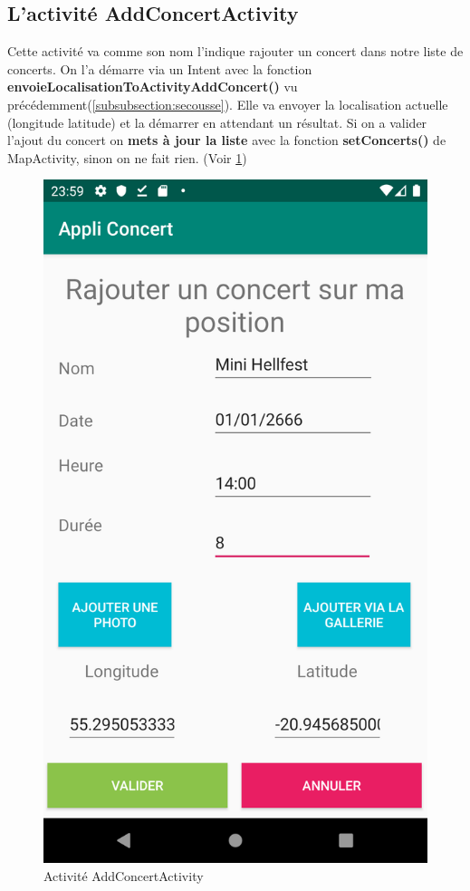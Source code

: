 \documentclass{article}
\begin{document}
\subsection{L'activité AddConcertActivity}
\label{AddConcertActivity}
Cette activité va comme son nom l'indique rajouter un concert dans notre liste de concerts. On l'a démarre via un Intent avec la fonction \textbf{envoieLocalisationToActivityAddConcert()} vu précédemment(\ref{subsubsection:secousse}). Elle va envoyer la localisation actuelle (longitude latitude) et la démarrer en attendant un résultat. Si on a valider l'ajout du concert on \textbf{mets à jour la liste} avec la fonction \textbf{setConcerts()} de MapActivity, sinon on ne fait rien. (Voir \ref{fig:ajouter})
\begin{figure}[h!]
\centering
\includegraphics[scale=0.13]{./img/ajouter.png}
\caption{Activité AddConcertActivity \label{fig:ajouter}}
\end{figure}
\end{document}

